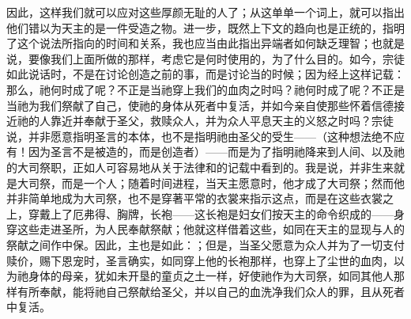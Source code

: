因此，这样我们就可以应对这些厚颜无耻的人了；从这单单一个词上，就可以指出他们错以为天主的是一件受造之物。进一步，既然上下文的趋向也是正统的，指明了这个说法所指向的时间和关系，我也应当由此指出异端者如何缺乏理智；也就是说，要像我们上面所做的那样，考虑它是何时使用的，为了什么目的。如今，宗徒如此说话时，不是在讨论创造之前的事，而是讨论当的时候；因为经上这样记载：那么，祂何时成了呢？不正是当祂穿上我们的血肉之时吗？祂何时成了呢？不正是当祂为我们祭献了自己，使祂的身体从死者中复活，并如今亲自使那些怀着信德接近祂的人靠近并奉献于圣父，救赎众人，并为众人平息天主的义怒之时吗？宗徒说，并非愿意指明圣言的本体，也不是指明祂由圣父的受生——（这种想法绝不应有！因为圣言不是被造的，而是创造者）——而是为了指明祂降来到人间、以及祂的大司祭职，正如人可容易地从关于法律和的记载中看到的。我是说，并非生来就是大司祭，而是一个人；随着时间进程，当天主愿意时，他才成了大司祭；然而他并非简单地成为大司祭，也不是穿著平常的衣裳来指示这点，而是在这些衣裳之上，穿戴上了厄弗得、胸牌，长袍——这长袍是妇女们按天主的命令织成的——身穿这些走进圣所，为人民奉献祭献；他就这样借着这些，如同在天主的显现与人的祭献之间作中保。因此，主也是如此：；但是，当圣父愿意为众人并为了一切支付赎价，赐下恩宠时，圣言确实，如同穿上他的长袍那样，也穿上了尘世的血肉，以为祂身体的母亲，犹如未开垦的童贞之土一样，好使祂作为大司祭，如同其他人那样有所奉献，能将祂自己祭献给圣父，并以自己的血洗净我们众人的罪，且从死者中复活。\par


